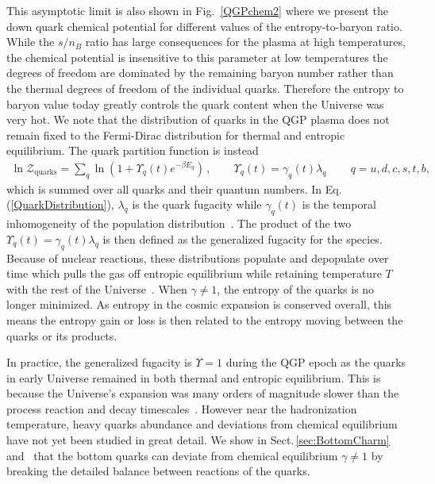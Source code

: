 \documentclass[universe,article,submit,moreauthors,pdftex,a4paper]{Definitions/mdpi}
\newcommand{\req}[1]{Eq.\,(\ref{#1})}
\newcommand*{\rf}[1]{Fig.~{\ref{#1}}}
\newcommand*{\rsec}[1]{Sect.\,{\ref{#1}}}
\begin{document}
This asymptotic limit is also shown in \rf{QGPchem2} where we present the down quark chemical potential for different values of the entropy-to-baryon ratio. While the $s/n_{B}$ ratio has large consequences for the plasma at high temperatures, the chemical potential is insensitive to this parameter at low temperatures the degrees of freedom are dominated by the remaining baryon number rather than the thermal degrees of freedom of the individual quarks. Therefore the entropy to baryon value today greatly controls the quark content when the Universe was very hot. We note that the distribution of quarks in the QGP plasma does not remain fixed to the Fermi-Dirac distribution for thermal and entropic equilibrium. The quark partition function is instead
\begin{align} \label{QuarkDistribution}\ln\mathcal{Z}_{\mathrm{quarks}}=\sum_{q}\ln\left(1+\Upsilon_{q}(t)e^{-\beta E_{q}}\right)\,,\qquad\Upsilon_{q}(t)=\gamma_{q}(t)\lambda_{q}\,\qquad q=u,d,c,s,t,b,
\end{align}
which is summed over all quarks and their quantum numbers. In \req{QuarkDistribution}, $\lambda_{q}$ is the quark fugacity while $\gamma_{q}(t)$ is the temporal inhomogeneity of the population distribution~\cite{Rafelski:2019twp}. The product of the two $\Upsilon_{q}(t)=\gamma_{q}(t)\lambda_{q}$ is then defined as the generalized fugacity for the species. Because of nuclear reactions, these distributions populate and depopulate over time which pulls the gas off entropic equilibrium while retaining temperature $T$ with the rest of the Universe~\cite{Letessier:2002ony}. When $\gamma\neq1$, the entropy of the quarks is no longer minimized. As entropy in the cosmic expansion is conserved overall, this means the entropy gain or loss is then related to the entropy moving between the quarks or its products.

In practice, the generalized fugacity is $\Upsilon=1$  during the QGP epoch as the quarks in early Universe remained in both thermal and entropic equilibrium. This is because the Universe's expansion was many orders of magnitude slower than the process reaction and decay timescales~\cite{Letessier:2002ony}. However near the hadronization temperature, heavy quarks abundance and deviations from chemical equilibrium have not yet been studied in great detail. We show in \rsec{sec:BottomCharm} and~\cite{Yang:2020nne,Yang:2023bot} that the bottom quarks can deviate from chemical equilibrium $\gamma\neq1$ by breaking the detailed balance between reactions of the quarks.
\end{document}

